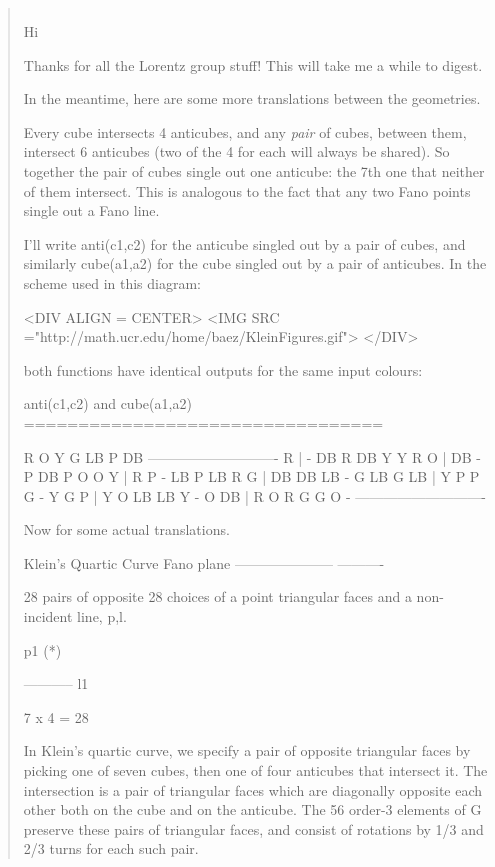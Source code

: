 \begin{quote}

$$

Hi

Thanks for all the Lorentz group stuff!  This will take me a while to 
digest.

In the meantime, here are some more translations between the geometries.

Every cube intersects 4 anticubes, and any \emph{pair} of cubes, between them, 
intersect 6 anticubes (two of the 4 for each will always be shared).  So 
together the pair of cubes single out one anticube:  the 7th one that 
neither of them intersect.  This is analogous to the fact that any two 
Fano points single out a Fano line.

I'll write anti({c1,c2}) for the anticube singled out by a pair of cubes, 
and similarly cube({a1,a2}) for the cube singled out by a pair of 
anticubes.  In the scheme used in this diagram:

<DIV ALIGN = CENTER>
<IMG SRC ="http://math.ucr.edu/home/baez/KleinFigures.gif">
</DIV>

both functions have identical outputs for the same input colours:


    anti({c1,c2})  and  cube({a1,a2})
    =================================

    R   O   Y   G   LB  P   DB
   ----------------------------
R  | -   DB  R   DB  Y   Y   R
O  | DB  -   P   DB  P   O   O
Y  | R   P   -   LB  P   LB  R
G  | DB  DB  LB  -   G   LB  G
LB | Y   P   P   G   -   Y   G
P  | Y   O   LB  LB  Y   -   O
DB | R   O   R   G   G   O   -
   ----------------------------

Now for some actual translations.

Klein's Quartic Curve      Fano plane
---------------------      ----------

28 pairs of opposite       28 choices of a point
triangular faces           and a non-incident line,
                           {p,l}.

                              p1
                              (*)

                           ----------- l1

                           7 x 4 = 28

In Klein's quartic curve, we specify a pair of opposite triangular faces 
by picking one of seven cubes, then one of four anticubes that intersect 
it.  The intersection is a pair of triangular faces which are diagonally 
opposite each other both on the cube and on the anticube.  The 56 order-3 
elements of G preserve these pairs of triangular faces, and consist of 
rotations by 1/3 and 2/3 turns for each such pair.


\end{quote}
